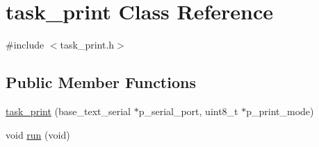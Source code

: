 \hypertarget{classtask__print}{\section{task\-\_\-print Class Reference}
\label{classtask__print}
}


{\ttfamily \#include $<$task\-\_\-print.\-h$>$}

\subsection*{Public Member Functions}
\begin{DoxyCompactItemize}
\item 
\hyperlink{classtask__print_a40c98a0ed4664ffe410da702ea0d3311}{task\-\_\-print} (base\-\_\-text\-\_\-serial $\ast$p\-\_\-serial\-\_\-port, uint8\-\_\-t $\ast$p\-\_\-print\-\_\-mode)
\item 
void \hyperlink{classtask__print_a568efc42203ca707a55ec464c6f420b9}{run} (void)
\end{DoxyCompactItemize}
